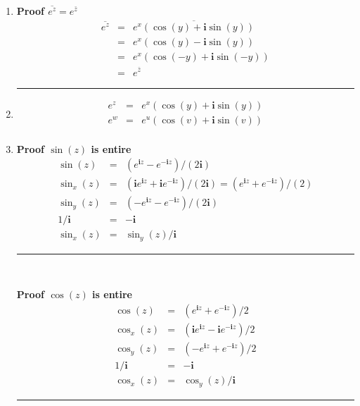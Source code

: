 \documentclass{article}%
\newcommand\I{\textbf{i}}
\newenvironment{proof}[1][]{\begin{samepage}\textbf{Proof #1} }{\rule{0.5em}{0.5em} \end{samepage}}
\begin{document}
\begin{enumerate}
\begin{enumerate}[label*=\arabic*.]
\begin{eqnarray*}
                &=& e^{xt}(\cos(yt)+ \I \sin(yt))
        \end{eqnarray*}
        $e^z$ is a spiral in the complex plane, with radius $e^{xt}$ and angle $yt$
        \item %
        \begin{proof}[$\overline{e^z}=e^{\bar{z}}$]
            \begin{eqnarray*}
                \overline{e^z} &=& \overline{e^x(\cos(y) + \I \sin(y))} \\
                               &=& e^x(\cos(y)-\I\sin(y)) \\
                               &=& e^x(\cos(-y)+\I\sin(-y)) \\
                               &=& e^{\bar{z}}
            \end{eqnarray*}
        \end{proof}
        \item %
        \begin{eqnarray*}
            e^z &=& e^x(\cos(y)+\I\sin(y)) \\
            e^w &=& e^u(\cos(v)+\I\sin(v)) \\
        \end{eqnarray*}
        \item %
        \begin{proof}[$\sin(z)$ is entire]
        \begin{eqnarray*}
            \sin(z) &=& (e^{\I z}-e^{-\I z})/(2 \I) \\
            \sin_x(z) &=& (\I e^{\I z}+\I e^{-\I z}) / (2\I) = (e^{\I z}+e^{-\I z})/(2) \\
            \sin_y(z) &=& (-e^{\I z} - e^{-\I z})/(2\I) \\
            1/\I &=& -\I \\
            \sin_x(z) &=& \sin_y(z)/\I
        \end{eqnarray*}
        \end{proof}\\
        \begin{proof}[$\cos(z)$ is entire]
        \begin{eqnarray*}
            \cos(z) &=& (e^{\I z}+e^{-\I z})/2 \\
            \cos_x(z) &=& (\I e^{\I z}-\I e^{-\I z}) / 2 \\
            \cos_y(z) &=& (-e^{\I z} + e^{-\I z})/2 \\
            1/\I &=& -\I \\
            \cos_x(z) &=& \cos_y(z)/\I

\end{eqnarray*}
\end{proof}
\end{enumerate}
\end{enumerate}
\end{document}
